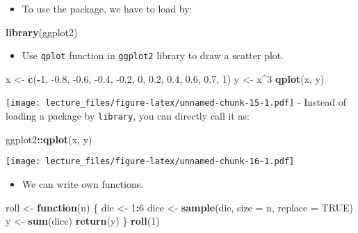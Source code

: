 \documentclass[
]{book}
\newenvironment{Shaded}{\begin{snugshade}}{\end{snugshade}}
\newcommand{\ControlFlowTok}[1]{\textcolor[rgb]{0.13,0.29,0.53}{\textbf{#1}}}
\newcommand{\DataTypeTok}[1]{\textcolor[rgb]{0.13,0.29,0.53}{#1}}
\newcommand{\DecValTok}[1]{\textcolor[rgb]{0.00,0.00,0.81}{#1}}
\newcommand{\FloatTok}[1]{\textcolor[rgb]{0.00,0.00,0.81}{#1}}
\newcommand{\KeywordTok}[1]{\textcolor[rgb]{0.13,0.29,0.53}{\textbf{#1}}}
\newcommand{\NormalTok}[1]{#1}
\newcommand{\OperatorTok}[1]{\textcolor[rgb]{0.81,0.36,0.00}{\textbf{#1}}}
\newcommand{\OtherTok}[1]{\textcolor[rgb]{0.56,0.35,0.01}{#1}}
\newcommand{\StringTok}[1]{\textcolor[rgb]{0.31,0.60,0.02}{#1}}
\providecommand{\tightlist}{%
  \setlength{\itemsep}{0pt}\setlength{\parskip}{0pt}}
\begin{document}
\begin{itemize}
\tightlist
\item
  To use the package, we have to load by:
\end{itemize}

\begin{Shaded}
\begin{Highlighting}[]
\KeywordTok{library}\NormalTok{(ggplot2)}
\end{Highlighting}
\end{Shaded}

\begin{itemize}
\tightlist
\item
  Use \texttt{qplot} function in \texttt{ggplot2} library to draw a scatter plot.
\end{itemize}

\begin{Shaded}
\begin{Highlighting}[]
\NormalTok{x <-}\StringTok{ }\KeywordTok{c}\NormalTok{(}\OperatorTok{-}\DecValTok{1}\NormalTok{, }\FloatTok{-0.8}\NormalTok{, }\FloatTok{-0.6}\NormalTok{, }\FloatTok{-0.4}\NormalTok{, }\FloatTok{-0.2}\NormalTok{, }\DecValTok{0}\NormalTok{, }\FloatTok{0.2}\NormalTok{, }\FloatTok{0.4}\NormalTok{, }\FloatTok{0.6}\NormalTok{, }\FloatTok{0.7}\NormalTok{, }\DecValTok{1}\NormalTok{)}
\NormalTok{y <-}\StringTok{ }\NormalTok{x}\OperatorTok{^}\DecValTok{3}
\KeywordTok{qplot}\NormalTok{(x, y)}
\end{Highlighting}
\end{Shaded}

\texttt{[image: lecture\_files/figure-latex/unnamed-chunk-15-1.pdf]}
- Instead of loading a package by \texttt{library}, you can directly call it as:

\begin{Shaded}
\begin{Highlighting}[]
\NormalTok{ggplot2}\OperatorTok{::}\KeywordTok{qplot}\NormalTok{(x, y)}
\end{Highlighting}
\end{Shaded}

\texttt{[image: lecture\_files/figure-latex/unnamed-chunk-16-1.pdf]}

\begin{itemize}
\tightlist
\item
  We can write own functions.
\end{itemize}

\begin{Shaded}
\begin{Highlighting}[]
\NormalTok{roll <-}\StringTok{ }\ControlFlowTok{function}\NormalTok{(n) \{}
\NormalTok{  die <-}\StringTok{ }\DecValTok{1}\OperatorTok{:}\DecValTok{6}
\NormalTok{  dice <-}\StringTok{ }\KeywordTok{sample}\NormalTok{(die, }\DataTypeTok{size =}\NormalTok{ n, }\DataTypeTok{replace =} \OtherTok{TRUE}\NormalTok{)}
\NormalTok{  y <-}\StringTok{ }\KeywordTok{sum}\NormalTok{(dice)}
  \KeywordTok{return}\NormalTok{(y)}
\NormalTok{\}}
\KeywordTok{roll}\NormalTok{(}\DecValTok{1}\NormalTok{)}
\end{Highlighting}
\end{Shaded}
\end{document}
